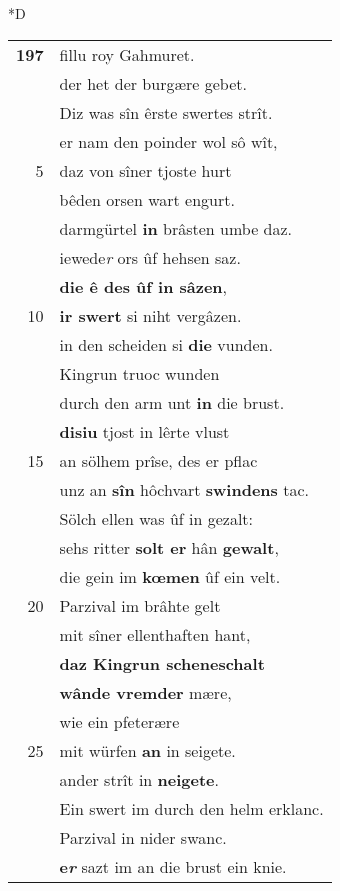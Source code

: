 \documentclass[8pt,a4paper,notitlepage]{article}
\begin{document}
\begin{table}[ht]
\begin{minipage}[t]{0.5\linewidth}
\small
\begin{center}*D
\end{center}
\begin{tabular}{rl}
\textbf{197} & fillu roy Gahmuret.\\ 
 & der het der burgære gebet.\\ 
 & Diz was sîn êrste swertes strît.\\ 
 & er nam den poinder wol sô wît,\\ 
5 & daz von sîner tjoste hurt\\ 
 & bêden orsen wart engurt.\\ 
 & darmgürtel \textbf{in} brâsten umbe daz.\\ 
 & iewede\textit{r} ors ûf hehsen saz.\\ 
 & \textbf{die ê des ûf in sâzen},\\ 
10 & \textbf{ir swert} si niht vergâzen.\\ 
 & in den scheiden si \textbf{die} vunden.\\ 
 & Kingrun truoc wunden\\ 
 & durch den arm unt \textbf{in} die brust.\\ 
 & \textbf{disiu} tjost in lêrte vlust\\ 
15 & an sölhem prîse, des er pflac\\ 
 & unz an \textbf{sîn} hôchvart \textbf{swindens} tac.\\ 
 & Sölch ellen was ûf in gezalt:\\ 
 & sehs ritter \textbf{solt er} hân \textbf{gewalt},\\ 
 & die gein im \textbf{kœmen} ûf ein velt.\\ 
20 & Parzival im brâhte gelt\\ 
 & mit sîner ellenthaften hant,\\ 
 & \textbf{daz Kingrun scheneschalt}\\ 
 & \textbf{wânde vremder} mære,\\ 
 & wie ein pfeterære\\ 
25 & mit würfen \textbf{an} in seigete.\\ 
 & ander strît in \textbf{neigete}.\\ 
 & Ein swert im durch den helm erklanc.\\ 
 & Parzival in nider swanc.\\ 
 & \textbf{e\textit{r}} sazt im an die brust ein knie.\\ 

\end{tabular}
\end{minipage}
\end{table}
\end{document}
